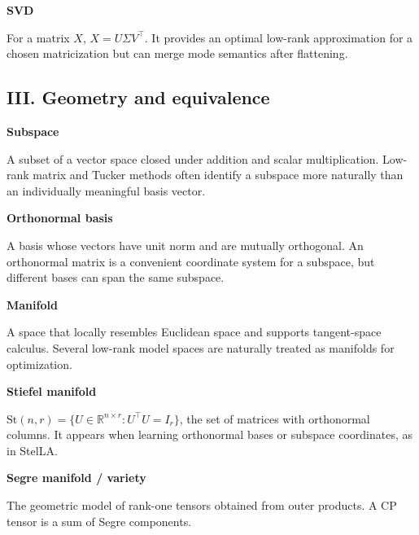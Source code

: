 \documentclass[10pt]{article}
\newenvironment{glossaryentry}[1]{%
  \par\medskip\noindent
  {\large\bfseries #1}\par\smallskip
}{\par\medskip}
\begin{document}
\begin{glossaryentry}{SVD}
For a matrix $X$, $X=U\Sigma V^\top$. It provides an optimal low-rank approximation for a chosen matricization but can merge mode semantics after flattening.
\par\smallskip{\small\color{muted}[KB09]}
\end{glossaryentry}


\subsection{III. Geometry and equivalence}

\begin{glossaryentry}{Subspace}
A subset of a vector space closed under addition and scalar multiplication. Low-rank matrix and Tucker methods often identify a subspace more naturally than an individually meaningful basis vector.
\par\smallskip{\small\color{muted}[AMS08]}
\end{glossaryentry}


\begin{glossaryentry}{Orthonormal basis}
A basis whose vectors have unit norm and are mutually orthogonal. An orthonormal matrix is a convenient coordinate system for a subspace, but different bases can span the same subspace.

\end{glossaryentry}


\begin{glossaryentry}{Manifold}
A space that locally resembles Euclidean space and supports tangent-space calculus. Several low-rank model spaces are naturally treated as manifolds for optimization.
\par\smallskip{\small\color{muted}[AMS08]}
\end{glossaryentry}


\begin{glossaryentry}{Stiefel manifold}
$\mathrm{St}(n,r)=\{U\in\mathbb R^{n\times r}:U^\top U=I_r\}$, the set of matrices with orthonormal columns. It appears when learning orthonormal bases or subspace coordinates, as in StelLA.
\par{}
\end{glossaryentry}


\begin{glossaryentry}{Segre manifold / variety}
The geometric model of rank-one tensors obtained from outer products. A CP tensor is a sum of Segre components.
\par\smallskip{\small\color{muted}[BV18]}
\end{glossaryentry}
\end{document}
